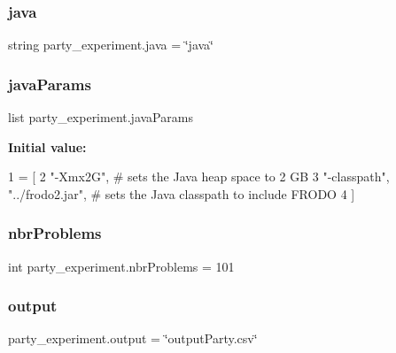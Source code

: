 \subsubsection{\texorpdfstring{java}{java}}
{\footnotesize\ttfamily string party\+\_\+experiment.\+java = \char`\"{}java\char`\"{}}

\mbox{\label{namespaceparty__experiment_a7f69216068bfee498c28ca4be6fda301}} 
\subsubsection{\texorpdfstring{java\+Params}{javaParams}}
{\footnotesize\ttfamily list party\+\_\+experiment.\+java\+Params}

{\bfseries Initial value\+:}
\begin{DoxyCode}
1 =  [
2             \textcolor{stringliteral}{"-Xmx2G"}, \textcolor{comment}{# sets the Java heap space to 2 GB}
3             \textcolor{stringliteral}{"-classpath"}, \textcolor{stringliteral}{"../frodo2.jar"}, \textcolor{comment}{# sets the Java classpath to include FRODO}
4             ]
\end{DoxyCode}
\mbox{\label{namespaceparty__experiment_a489d5eedda75d9430bb1a5667b86c89f}} 
\subsubsection{\texorpdfstring{nbr\+Problems}{nbrProblems}}
{\footnotesize\ttfamily int party\+\_\+experiment.\+nbr\+Problems = 101}

\mbox{\label{namespaceparty__experiment_ad72182b83d7e7b5dd7b567bce35bca26}} 
\subsubsection{\texorpdfstring{output}{output}}
{\footnotesize\ttfamily party\+\_\+experiment.\+output = \char`\"{}output\+Party.\+csv\char`\"{}}

